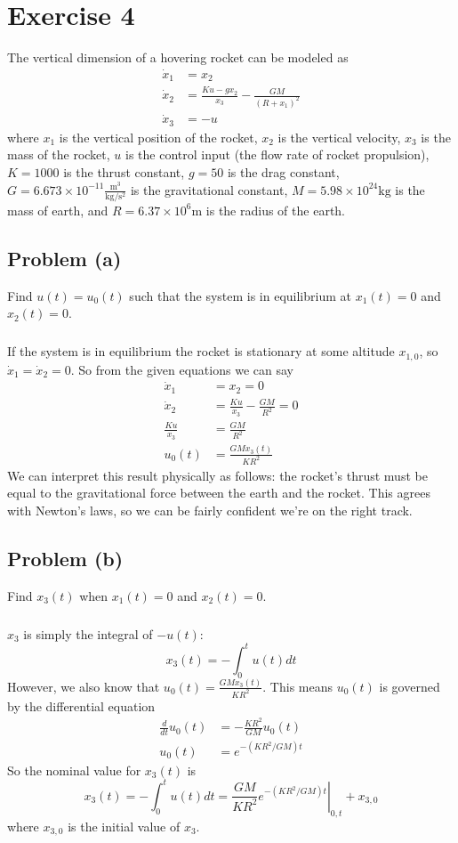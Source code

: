 \documentclass[11pt]{article}
\begin{document}
\section*{Exercise 4}
The vertical dimension of a hovering rocket can be modeled as
\begin{align*}
	\dot{x}_1 &= x_2 \\
	\dot{x}_2 &= \frac{Ku-gx_2}{x_3} - \frac{GM}{(R+x_1)^2} \\
	\dot{x}_3 &= -u
\end{align*}
where $x_1$ is the vertical position of the rocket, $x_2$ is the vertical velocity, $x_3$ is the mass of the rocket, $u$ is the control input (the flow rate of rocket propulsion), $K=1000$ is the thrust constant, $g=50$ is the drag constant, $G=6.673\times10^{-11}\frac{\text{m}^3}{\text{kg}/\text{s}^2}$ is the gravitational constant, $M=5.98\times10^{24}\text{kg}$ is the mass of earth, and $R=6.37\times10^6\text{m}$ is the radius of the earth.

\subsection*{Problem (a)}
Find $u(t)=u_0(t)$ such that the system is in equilibrium at $x_1(t)=0$ and $x_2(t)=0$.

\subparagraph*{}
If the system is in equilibrium the rocket is stationary at some altitude $x_{1,0}$, so $\dot{x}_1 = \dot{x}_2 = 0$. So from the given equations we can say
\begin{align*}
	\dot{x}_1 &= x_2 = 0 \\
	\dot{x}_2 &= \frac{Ku}{x_3} - \frac{GM}{R^2} = 0\\
	\frac{Ku}{x_3} &= \frac{GM}{R^2} \\
	u_0(t) &= \frac{GMx_3(t)}{KR^2}
\end{align*}
We can interpret this result physically as follows: the rocket's thrust must be equal to the gravitational force between the earth and the rocket. This agrees with Newton's laws, so we can be fairly confident we're on the right track. 

\subsection*{Problem (b)}
Find $x_3(t)$ when $x_1(t)=0$ and $x_2(t)=0$.

\subparagraph*{}
$x_3$ is simply the integral of $-u(t)$:
\begin{equation*}
	x_3(t) = -\int_{0}^{t}u(t)dt
\end{equation*}
However, we also know that $u_0(t) =  \frac{GMx_3(t)}{KR^2}$. This means $u_0(t)$ is governed by the differential equation
\begin{align*}
	\frac{d}{dt}u_0(t) &= -\frac{KR^2}{GM}u_0(t) \\
	u_0(t) &= e^{-(KR^2/GM)t}
\end{align*}
So the nominal value for $x_3(t)$ is
\begin{equation*}
	x_3(t) = -\int_{0}^{t}u(t)dt = \left. \frac{GM}{KR^2} e^{-(KR^2/GM)t} \right |_{0,t} + x_{3,0}
\end{equation*}
where $x_{3,0}$ is the initial value of $x_3$.
\end{document}
